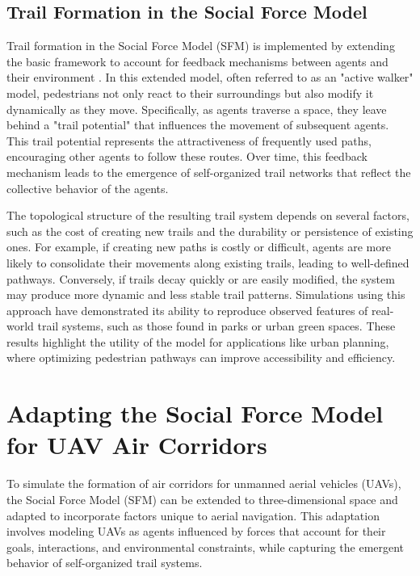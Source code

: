 \documentclass[letterpaper,11pt]{article}
\begin{document}
\subsection{Trail Formation in the Social Force Model}

Trail formation in the Social Force Model (SFM) is implemented by extending the basic framework to account for feedback mechanisms between agents and their environment \cite{Helbing1997,helbing1998computersimulationspedestriandynamics}. In this extended model, often referred to as an "active walker" model, pedestrians not only react to their surroundings but also modify it dynamically as they move. Specifically, as agents traverse a space, they leave behind a "trail potential" that influences the movement of subsequent agents. This trail potential represents the attractiveness of frequently used paths, encouraging other agents to follow these routes. Over time, this feedback mechanism leads to the emergence of self-organized trail networks that reflect the collective behavior of the agents.

The topological structure of the resulting trail system depends on several factors, such as the cost of creating new trails and the durability or persistence of existing ones. For example, if creating new paths is costly or difficult, agents are more likely to consolidate their movements along existing trails, leading to well-defined pathways. Conversely, if trails decay quickly or are easily modified, the system may produce more dynamic and less stable trail patterns. Simulations using this approach have demonstrated its ability to reproduce observed features of real-world trail systems, such as those found in parks or urban green spaces. These results highlight the utility of the model for applications like urban planning, where optimizing pedestrian pathways can improve accessibility and efficiency.



\section{Adapting the Social Force Model for UAV Air Corridors}

To simulate the formation of air corridors for unmanned aerial vehicles (UAVs), the Social Force Model (SFM) can be extended to three-dimensional space and adapted to incorporate factors unique to aerial navigation. This adaptation involves modeling UAVs as agents influenced by forces that account for their goals, interactions, and environmental constraints, while capturing the emergent behavior of self-organized trail systems.
\end{document}

